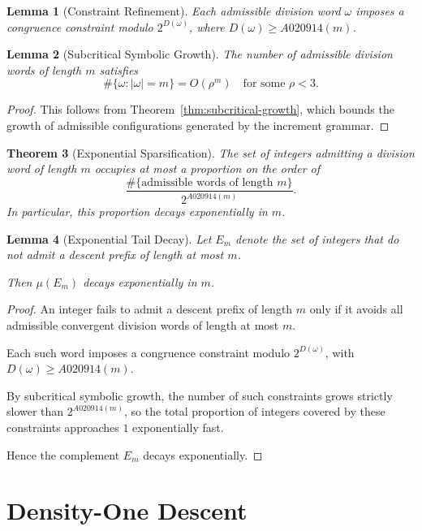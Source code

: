 \documentclass[12pt, oneside]{article}
\numberwithin{equation}{section}
\theoremstyle{definition}
\theoremstyle{plain}
\newtheorem{theorem}{Theorem}[section]
\newtheorem{lemma}[theorem]{Lemma}
\theoremstyle{remark}
\begin{document}
\begin{lemma}[Constraint Refinement]
Each admissible division word $\omega$ imposes a congruence constraint
modulo $2^{D(\omega)}$, where $D(\omega) \ge A020914(m)$.
\end{lemma}

\begin{lemma}[Subcritical Symbolic Growth]
The number of admissible division words of length $m$ satisfies
\[
\#\{\omega : |\omega|=m\} = O(\rho^m)
\quad \text{for some } \rho < 3.
\]
\end{lemma}

\begin{proof}
This follows from Theorem~\ref{thm:subcritical-growth}, which bounds the growth
of admissible configurations generated by the increment grammar.
\end{proof}

\begin{theorem}[Exponential Sparsification]
The set of integers admitting a division word of length $m$ occupies at most
a proportion on the order of
\[
\frac{\#\{\text{admissible words of length } m\}}{2^{A020914(m)}}.
\]
In particular, this proportion decays exponentially in $m$.
\end{theorem}

\begin{lemma}[Exponential Tail Decay]
Let $E_m$ denote the set of integers that do not admit a descent prefix
of length at most $m$.

Then $\mu(E_m)$ decays exponentially in $m$.
\end{lemma}

\begin{proof}
An integer fails to admit a descent prefix of length $m$ only if it avoids
all admissible convergent division words of length at most $m$.

Each such word imposes a congruence constraint modulo $2^{D(\omega)}$,
with $D(\omega) \ge A020914(m)$.

By subcritical symbolic growth, the number of such constraints grows
strictly slower than $2^{A020914(m)}$, so the total proportion of integers
covered by these constraints approaches $1$ exponentially fast.

Hence the complement $E_m$ decays exponentially.
\end{proof}

\section{Density-One Descent}
\end{document}
